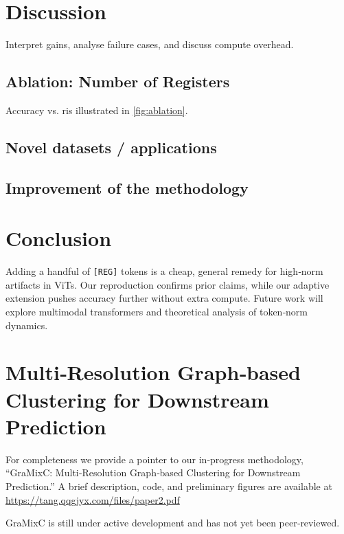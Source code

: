 \documentclass{article}
\newcommand{\RegTok}{\texttt{[REG]}\xspace}
\newcommand{\nreg}{r}
\begin{document}
\section{Discussion}
\label{sec:discussion}
Interpret gains, analyse failure cases, and discuss compute overhead.

\subsection{Ablation: Number of Registers}
Accuracy vs. \nreg is illustrated in \cref{fig:ablation}.

\subsection{Novel datasets / applications} \label{sec:novel_datasets}

\subsection{Improvement of the methodology} \label{sec:improvement}

\section{Conclusion}
Adding a handful of \RegTok tokens is a cheap, general remedy for high‑norm artifacts in ViTs.  Our reproduction confirms prior claims, while our adaptive extension pushes accuracy further without extra compute.  Future work will explore multimodal transformers and theoretical analysis of token‑norm dynamics.

\printbibliography


\appendix

\section{Multi‑Resolution Graph‑based Clustering for Downstream Prediction}
\label{sec:gmc}

For completeness we provide a pointer to our in‑progress methodology, ``GraMixC: Multi‑Resolution Graph‑based Clustering for Downstream Prediction.''
A brief description, code, and preliminary figures are available at         \url{https://tang.qqgjyx.com/files/paper2.pdf}

GraMixC is still under active development and has not yet been peer‑reviewed.
\end{document}
